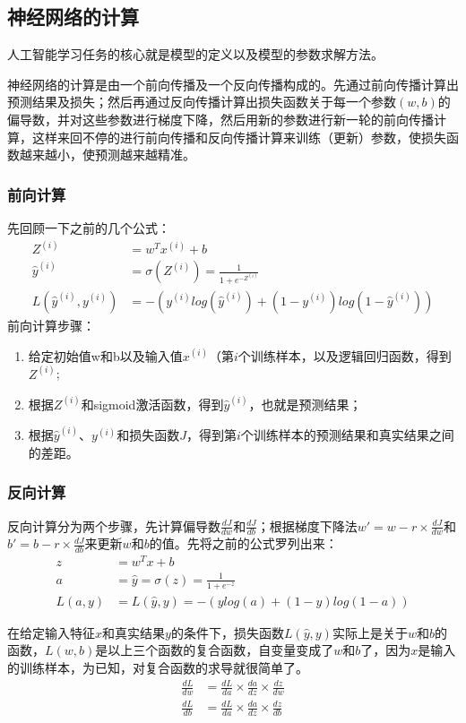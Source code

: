 \subsection{神经网络的计算} 
	人工智能学习任务的核心就是模型的定义以及模型的参数求解方法。
	
	神经网络的计算是由一个前向传播及一个反向传播构成的。先通过前向传播计算出预测结果及损失；然后再通过反向传播计算出损失函数关于每一个参数$(w, b)$的偏导数，并对这些参数进行梯度下降，然后用新的参数进行新一轮的前向传播计算，这样来回不停的进行前向传播和反向传播计算来训练（更新）参数，使损失函数越来越小，使预测越来越精准。
	
\subsubsection{前向计算}
先回顾一下之前的几个公式：
\begin{align*}
Z^{(i)} &= w^Tx^{(i)} + b \\
\hat{y}^{(i)} &= \sigma (Z^{(i)}) = \frac{1}{1 + e^{-Z^{(i)}}} \\
L(\hat{y}^{(i)}, y^{(i)}) &= -(y^{(i)}log(\hat{y}^{(i)}) + (1 - y^{(i)})log(1 - \hat{y}^{(i)}))
\end{align*}
前向计算步骤：
\begin{enumerate}
	\item 给定初始值w和b以及输入值$x^{(i)}$（第$i$个训练样本，以及逻辑回归函数，得到$Z^{(i)}$;
	\item 根据$Z^{(i)}$和sigmoid激活函数，得到$\hat{y}^{(i)}$，也就是预测结果；
	\item 根据$\hat{y}^{(i)}$、$y^{(i)}$和损失函数$J$，得到第$i$个训练样本的预测结果和真实结果之间的差距。
\end{enumerate}

\subsubsection{反向计算}
反向计算分为两个步骤，先计算偏导数$\frac{dJ}{dw}$和$\frac{dJ}{db}$；根据梯度下降法$w' = w - r \times \frac{dJ}{dw}$和$b' = b - r \times \frac{dJ}{db}$来更新$w$和$b$的值。先将之前的公式罗列出来：
\begin{align*}
	z &= w^Tx + b \\
	a &= \hat{y} = \sigma (z) = \frac{1}{1 + e^{-z}} \\
	L(a, y) &= 	L(\hat{y}, y) = -(ylog(a) + (1 - y)log(1 - a))
\end{align*}

在给定输入特征$x$和真实结果$y$的条件下，损失函数$L(\hat{y}, y)$实际上是关于$w$和$b$的函数，$L(w, b)$是以上三个函数的复合函数，自变量变成了$w$和$b$了，因为$x$是输入的训练样本，为已知，对复合函数的求导就很简单了。
\begin{align}
\frac{dL}{dw} &= \frac{dL}{da} \times \frac{da}{dz} \times \frac{dz}{dw} \\
\frac{dL}{db} &= \frac{dL}{da} \times \frac{da}{dz} \times \frac{dz}{db}
\end{align}

